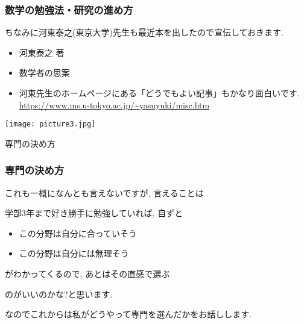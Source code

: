 \documentclass[11pt,dvipdfmx]{beamer}
\theoremstyle{definition}
\theoremstyle{remark}
\begin{document}
\begin{frame} 
 \frametitle{数学の勉強法・研究の進め方}

ちなみに河東泰之(東京大学)先生も最近本を出したので宣伝しておきます. 
   \begin{multicols}{2}
       \begin{itemize}
       	     \item 河東泰之 著
	    \item 数学者の思案
	    \item 河東先生のホームページにある「どうでもよい記事」もかなり面白いです. \url{https://www.ms.u-tokyo.ac.jp/~yasuyuki/misc.htm}
	\end{itemize}
     \texttt{[image: picture3.jpg]}
   \end{multicols}
\end{frame}


\begin{frame}  
 \begin{center}
専門の決め方
 \end{center}
 
\end{frame}

\begin{frame} 
 \frametitle{専門の決め方}

これも一概になんとも言えないですが, 言えることは
\pause
\begin{block}{}
\begin{center}
学部3年まで好き勝手に勉強していれば, 自ずと
\begin{itemize}
\item この分野は自分に合っていそう
\item この分野は自分には無理そう
\end{itemize}
がわかってくるので, あとはその直感で選ぶ
\end{center}
\end{block}

のがいいのかな?と思います. 

なのでこれからは私がどうやって専門を選んだかをお話しします. 

\end{frame}
\end{document}
